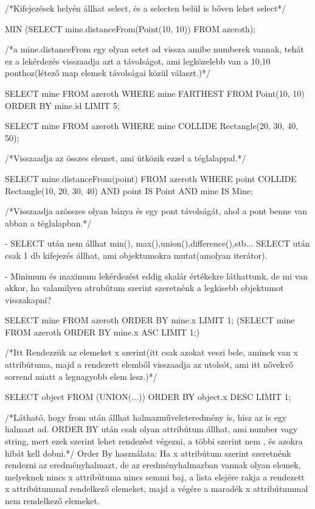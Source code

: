 \begin{sql}
/*Kifejezések helyén állhat select, és a selecten belül is bőven lehet select*/

\begin{sql}
MIN (SELECT mine.distanceFrom(Point(10, 10)) FROM azeroth);
\end{sql}
/*a mine.distanceFrom egy olyan setet ad vissza amibe numberek vannak, tehát ez a lekérdezés visszaadja azt a távolságot, ami legközelebb van
a 10,10 ponthoz(létező map elemek távolságai közül választ.)*/

\begin{sql}
SELECT mine
FROM azeroth
WHERE mine FARTHEST FROM Point(10, 10)
ORDER BY mine.id
LIMIT 5;
\end{sql}

\begin{sql}
SELECT mine
FROM azeroth
WHERE mine COLLIDE Rectangle(20, 30, 40, 50);
\end{sql}
/*Visszaadja az összes elemet, ami ütközik ezzel a téglalappal.*/

\begin{sql}
SELECT mine.distanceFrom(point)
FROM azeroth
WHERE
point COLLIDE Rectangle(10, 20, 30, 40) AND
point IS Point AND
mine IS Mine;
\end{sql}
/*Visszaadja azösszes olyan bánya és egy pont távolságát, ahol a pont benne van abban a téglalapban.*/

- SELECT után nem állhat min(), max(),union(),difference(),stb...
SELECT után csak 1 db kifejezés állhat, ami objektumokra mutat(amolyan iterátor).

- Minimum és maximum lekérdezést eddig skalár értékekre láthattunk, de mi van akkor, ha valamilyen atrubútum szerint szeretnénk a legkisebb objektumot visszakapni?

\begin{sql}
SELECT mine FROM azeroth ORDER BY mine.x LIMIT 1;
(SELECT mine FROM azeroth ORDER BY mine.x ASC LIMIT 1;)
\end{sql}
/*Itt Rendezzük az elemeket x szerint(itt csak azokat veszi bele, aminek van x attribútuma, majd a rendezett elemből visszaadja az utolsót, ami itt nővekvő sorrend miatt a legnagyobb elem lesz.)*/

\begin{sql}
SELECT object FROM (UNION(...)) ORDER BY object.x DESC LIMIT 1;
\end{sql}
/*Látható, hogy from után állhat halmazműveleteredmény is, hisz az is egy halmazt ad. ORDER BY után csak olyan attribútum állhat, ami number vagy string, mert ezek szerint lehet rendezést végezni, a többi szerint nem , és azokra hibát kell dobni.*/
Order By használata: Ha x attribútum szerint szeretnénk rendezni az eredményhalmazt, de az eredményhalmazban vannak olyan elemek, melyeknek nincs x attribútuma nincs semmi baj, a lista elejére rakja a rendezett x attribútummal rendelkező elemeket, majd a végére a maradék x attribútummal nem rendelkező elemeket. 


\end{sql}
